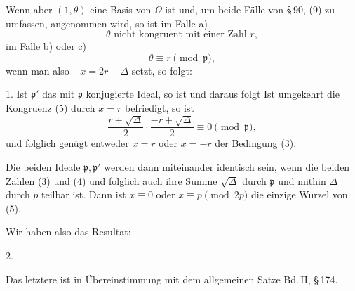 Wenn aber $(1, \theta)$ eine Basis von $\Omega$ ist und, um beide Fälle
von §\,90, (9) zu umfassen,
angenommen wird, so ist im Falle a)
\[
\theta \text{ nicht kongruent mit einer Zahl } r,
\]
im Falle b) oder c)
\[
\theta \equiv r \pmod{\mathfrak{p}},
\]
wenn man also $-x = 2r + \Delta$ setzt, so folgt:

1. 
Ist $\mathfrak{p}'$ das mit $\mathfrak{p}$ konjugierte Ideal, so ist
und daraus folgt
Ist umgekehrt die Kongruenz (5) durch $x = r$ befriedigt, so ist
\[
\frac{r+\sqrt{\Delta}}{2}\cdot\frac{-r+\sqrt{\Delta}}{2} \equiv 0 \pmod{\mathfrak{p}},
\]
und folglich genügt entweder $x = r$ oder $x = -r$ der Bedingung (3).

Die beiden Ideale $\mathfrak{p}, \mathfrak{p}'$ werden dann miteinander identisch
sein, wenn die beiden Zahlen (3) und (4) und folglich auch ihre
Summe $\sqrt{\Delta}$ durch $\mathfrak{p}$ und mithin $\Delta$ durch $p$ teilbar ist. Dann ist
$x \equiv 0$ oder $x \equiv p \pmod{2p}$ die einzige Wurzel von (5).

Wir haben also das Resultat:

2. 

Das letztere ist in Übereinstimmung mit dem allgemeinen
Satze Bd.\,II, §\,174.
